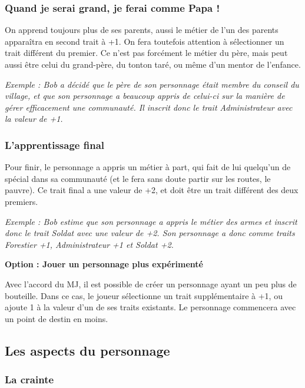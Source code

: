 \documentclass[twoside,12pt,english]{book}
\begin{document}
\subsubsection*{Quand je serai grand, je ferai comme Papa !}

On apprend toujours plus de ses parents, aussi le métier de l'un des parents apparaîtra en second trait à +1. On fera toutefois attention à sélectionner un trait différent du premier. Ce n'est pas forcément le métier du père, mais peut aussi être celui du grand-père, du tonton taré, ou même d'un mentor de l'enfance.

\emph{Exemple : Bob a décidé que le père de son personnage était membre du conseil du village, et que son personnage a beaucoup appris de celui-ci sur la manière de gérer efficacement une communauté. Il inscrit donc le trait Administrateur avec la valeur de +1.}

\subsubsection*{L'apprentissage final}

Pour finir, le personnage a appris un métier à part, qui fait de lui quelqu'un de spécial dans sa communauté (et le fera sans doute partir sur les routes, le pauvre). Ce trait final a une valeur de +2, et doit être un trait différent des deux premiers.

\emph{Exemple : Bob estime que son personnage a appris le métier des armes et inscrit donc le trait Soldat avec une valeur de +2. Son personnage a donc comme traits Forestier +1, Administrateur +1 et Soldat +2.}

\begin{mdframed}
\textbf{Option : Jouer un personnage plus expérimenté}

Avec l'accord du MJ, il est possible de créer un personnage ayant un peu plus de bouteille. Dans ce cas, le joueur sélectionne un trait supplémentaire à +1, ou ajoute 1 à la valeur d'un de ses traits existants. Le personnage commencera avec un point de destin en moins.
\end{mdframed}

\subsection{Les aspects du personnage}

\subsubsection*{La crainte}
\end{document}
